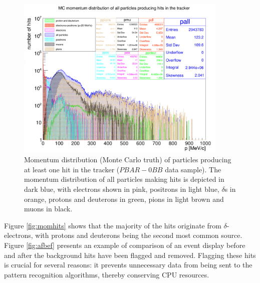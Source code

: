 \begin{figure}[!h]
    \centering
    \includegraphics[width =0.9\textwidth]{figures/png/Screenshot_20240815_124710.png}
\caption[Monte Carlo momentum distribution 
of particles producing hits in the Mu2e 
tracker ($PBAR-0BB$ data sample).]{
    Momentum distribution (Monte Carlo truth) 
    of particles producing at 
   least one hit in the tracker 
   ($PBAR-0BB$ data sample). 
   The momentum distribution 
   of all particles making hits is 
   depicted in dark blue, with electrons 
   shown in pink, positrons in light 
   blue, $\delta$s in orange, protons 
   and deuterons in green, pions in 
   light brown and muons 
   in black. }
   \label{fig:pbar}
 \end{figure}


Figure \ref{fig:momhits} shows that 
the majority of the hits originate from $\delta$-electrons, 
with protons and deuterons being the second most 
common source. Figure \ref{fig:afbef} 
presents an example of comparison of an 
event display before and after the background 
hits have been flagged and removed.  
Flagging these hits is crucial for 
several reasons: it prevents unnecessary 
data from being sent to the pattern 
recognition algorithms, thereby conserving 
CPU resources.

